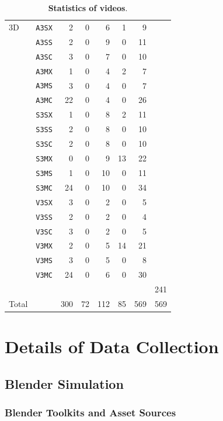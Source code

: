 \begin{table}[t]
\begin{tabular}{l | l r r r r r r}
3D & \texttt{A3SX} & 2 & 0 & 6 & 1  & 9  &  \\
   & \texttt{A3SS} & 2 & 0 & 9 & 0  & 11 &  \\
   & \texttt{A3SC} & 3 & 0 & 7 & 0  & 10 &  \\
   & \texttt{A3MX} & 1 & 0 & 4 & 2  & 7  &  \\
   & \texttt{A3MS} & 3 & 0 & 4 & 0  & 7  &  \\
   & \texttt{A3MC} & 22 & 0 & 4 & 0 & 26 &  \\
   & \texttt{S3SX} & 1 & 0 & 8 & 2  & 11 & \\
   & \texttt{S3SS} & 2 & 0 & 8 & 0  & 10 & \\
   & \texttt{S3SC} & 2 & 0 & 8 & 0  & 10 & \\
   & \texttt{S3MX} & 0 & 0 & 9 & 13 & 22 & \\
   & \texttt{S3MS} & 1 & 0 & 10 & 0 & 11 & \\
   & \texttt{S3MC} & 24 & 0 & 10 & 0 & 34 & \\
   & \texttt{V3SX} & 3 & 0 & 2 & 0  & 5  &  \\
   & \texttt{V3SS} & 2 & 0 & 2 & 0  & 4  &  \\
   & \texttt{V3SC} & 3 & 0 & 2 & 0  & 5  &  \\
   & \texttt{V3MX} & 2 & 0 & 5 & 14 & 21 & \\
   & \texttt{V3MS} & 3 & 0 & 5 & 0  & 8  &  \\
   & \texttt{V3MC} & 24 & 0 & 6 & 0 & 30 & \\
\hline
   &       &   &   &   &   &    & 241 \\
\midrule
Total &      & 300 & 72 & 112 & 85 & 569 & 569 \\
\bottomrule
\end{tabular}
\caption{\textbf{Statistics of videos}.}
\label{tab:2d3d-summary}
\end{table}


\section{Details of Data Collection}

\subsection{Blender Simulation}

\subsubsection{Blender Toolkits and Asset Sources}
\label{subsec:blender_toolkits}

